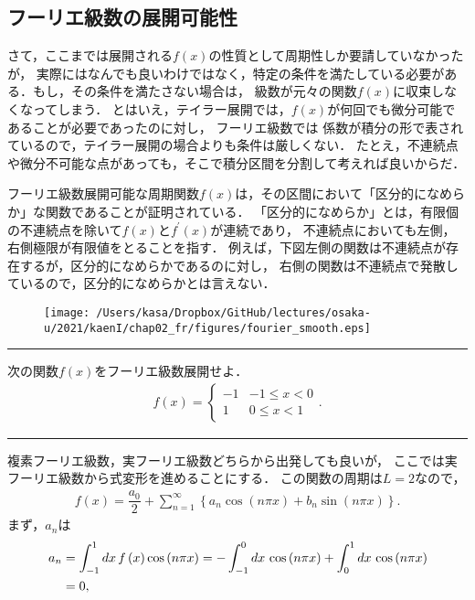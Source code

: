 \subsection{フーリエ級数の展開可能性}
%
さて，ここまでは展開される$f(x)$の性質として周期性しか要請していなかったが，
実際にはなんでも良いわけではなく，特定の条件を満たしている必要がある．もし，その条件を満たさない場合は，
級数が元々の関数$f(x)$に収束しなくなってしまう．
とはいえ，テイラー展開では，$f\left(x\right)$が何回でも微分可能であることが必要であったのに対し，
フーリエ級数では
係数が積分の形で表されているので，テイラー展開の場合よりも条件は厳しくない．
たとえ，不連続点や微分不可能な点があっても，そこで積分区間を分割して考えれば良いからだ．

フーリエ級数展開可能な周期関数$f(x)$は，その区間において「区分的になめらか」な関数であることが証明されている．
「区分的になめらか」とは，有限個の不連続点を除いて$f(x)$と$f^{\prime}(x)$が連続であり，
不連続点においても左側，右側極限が有限値をとることを指す．
例えば，下図左側の関数は不連続点が存在するが，区分的になめらかであるのに対し，
右側の関数は不連続点で発散しているので，区分的になめらかとは言えない．
\begin{figure}[htbp]
 \texttt{[image: /Users/kasa/Dropbox/GitHub/lectures/osaka-u/2021/kaenI/chap02\_fr/figures/fourier\_smooth.eps]} 
\end{figure}
%
\newpage
%
\hrule
\reidai
次の関数$f(x)$をフーリエ級数展開せよ．
\begin{align}
  f\left(x\right) =
  \begin{cases}
    -1 & -1 \leq x < 0 \\
     1 & 0  \leq x < 1 
  \end{cases}. 
\end{align}
\vspace*{.2cm}
\hrule
\vspace*{.2cm}
複素フーリエ級数，実フーリエ級数どちらから出発しても良いが，
ここでは実フーリエ級数から式変形を進めることにする．
この関数の周期は$L=2$なので，
\begin{align}
 f\left(x\right) = \dfrac{a_0}{2} 
                   + \sum_{n=1}^{\infty}\left\{a_n \cos\left(n\pi x\right)
                                             +b_n \sin\left(n\pi x\right)\right\}.
\end{align}
まず，$a_n$は
\begin{align}
  a_n &= \int_{-1}^{1}dx\,f\left(x\right)\cos\left(n\pi x\right) 
       = -\int_{-1}^{0}dx\, \cos\left(n\pi x\right) + \int_{0}^{1}dx\,\cos\left(n\pi x\right) \notag \\
      &= 0,
\end{align}

